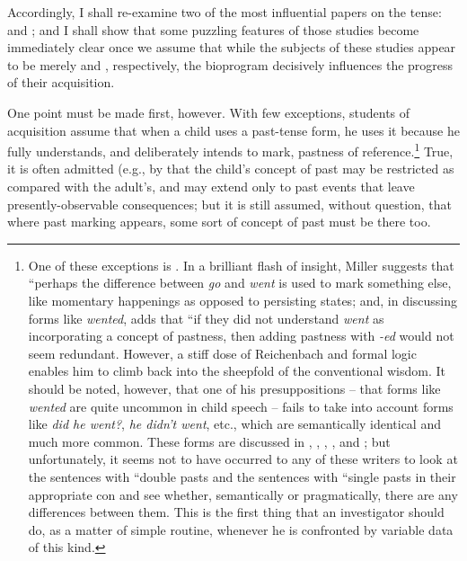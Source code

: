 Accordingly, I shall re-examine two of the most influential papers on the  tense: \citet{BrockartEtAl1973} and \citet{AntinucciEtAl1976}; and I shall show that some puzzling features of those studies become immediately clear once we assume that while the subjects of these studies appear to be merely   and , respectively, the bioprogram decisively influences the progress of their acquisition.

One point must be made first, however. With few exceptions, students of acquisition assume that when a child uses a past-tense form, he uses it because he fully understands, and deliberately intends to mark, pastness of reference.\footnote{One of these exceptions is \citet{Miller1978}. In a brilliant flash of insight, Miller suggests that ``perhaps the difference between \textit{go} and \textit{went} is used to mark something else, like momentary happenings as opposed to persisting states; and, in discussing forms like \textit{wented}, adds that ``if they did not understand \textit{went} as incorporating a concept of pastness, then adding pastness with \textit{-ed} would not seem redundant. However, a stiff dose of Reichenbach and formal logic enables him to climb back into the sheepfold of the conventional wisdom. It should be noted, however, that one of his presuppositions -- that forms like \textit{wented} are quite uncommon in child speech -- fails to take into account forms like \textit{did he went?}, \textit{he didn't went}, etc., which are semantically identical and much more common. These forms are discussed in \citet{Hurford1975}, \citet{Kuczaj1976}, \citet{Fay1978}, \citet{MaratsosEtAl1978}, and \citet{ErreichEtAl1980}; but unfortunately, it seems not to have occurred to any of these writers to look at the sentences with ``double pasts and the sentences with ``single pasts in their appropriate con and see whether, semantically or pragmatically, there are any differences between them. This is the first thing that an investigator should do, as a matter of simple routine, whenever he is confronted by variable data of this kind.\label{Fn5}} True, it is often admitted (e.g., by \citet{AntinucciEtAl1976} that the child's concept of past may be restricted as compared with the adult's, and may extend only to past events that leave presently-observable consequences; but it is still assumed, without question, that where past marking appears, some sort of concept of past must be there too.

